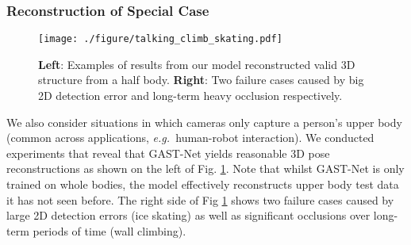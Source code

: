 \documentclass[letterpaper, 10 pt, conference, twoside]{ieeeconf}
\newcommand{\eg}{{\em e.g.\ }}
\begin{document}
\subsubsection{Reconstruction of Special Case}
\begin{figure}[t]
	\centering
	\texttt{[image: ./figure/talking\_climb\_skating.pdf]}
	\caption{\textbf{Left}: Examples of results from our model reconstructed valid 3D structure from a half body. \textbf{Right}: Two failure cases caused by big 2D detection error and long-term heavy occlusion respectively.}
	\label{fig:half_body_failure_case}
\end{figure}
\begin{table}[t]
	\centering
	\caption{Test time of estimation speed}
	\label{table:5}
\end{table}
We also consider situations in which cameras only capture a person's upper body (common across applications, \eg human-robot interaction). We conducted experiments that reveal that GAST-Net yields reasonable 3D pose reconstructions as shown on the left of Fig. \ref{fig:half_body_failure_case}. Note that whilst GAST-Net is only trained on whole bodies, the model effectively reconstructs upper body test data it has not seen before. The right side of Fig \ref{fig:half_body_failure_case} shows two failure cases caused by large 2D detection errors (ice skating) as well as significant occlusions over long-term periods of time (wall climbing).
\end{document}

